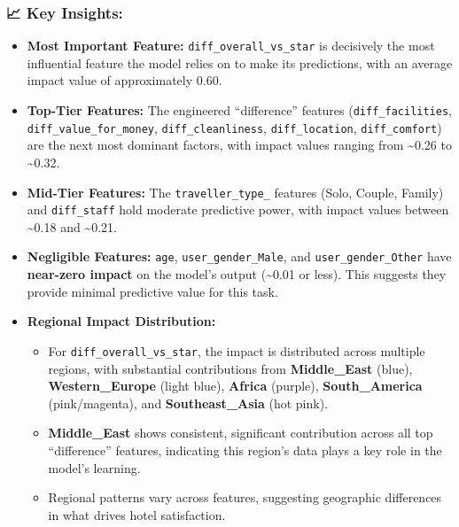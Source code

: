 \documentclass[
  letterpaper,
  DIV=11,
  numbers=noendperiod]{scrartcl}
\providecommand{\tightlist}{%
  \setlength{\itemsep}{0pt}\setlength{\parskip}{0pt}}
\begin{document}
\subsubsection{📈 Key Insights:}\label{key-insights}

\begin{itemize}
\tightlist
\item
  \textbf{Most Important Feature:} \texttt{diff\_overall\_vs\_star} is
  decisively the most influential feature the model relies on to make
  its predictions, with an average impact value of approximately 0.60.
\item
  \textbf{Top-Tier Features:} The engineered ``difference'' features
  (\texttt{diff\_facilities}, \texttt{diff\_value\_for\_money},
  \texttt{diff\_cleanliness}, \texttt{diff\_location},
  \texttt{diff\_comfort}) are the next most dominant factors, with
  impact values ranging from \textasciitilde0.26 to \textasciitilde0.32.
\item
  \textbf{Mid-Tier Features:} The \texttt{traveller\_type\_} features
  (Solo, Couple, Family) and \texttt{diff\_staff} hold moderate
  predictive power, with impact values between \textasciitilde0.18 and
  \textasciitilde0.21.
\item
  \textbf{Negligible Features:} \texttt{age},
  \texttt{user\_gender\_Male}, and \texttt{user\_gender\_Other} have
  \textbf{near-zero impact} on the model's output (\textasciitilde0.01
  or less). This suggests they provide minimal predictive value for this
  task.
\item
  \textbf{Regional Impact Distribution:}

  \begin{itemize}
  \tightlist
  \item
    For \texttt{diff\_overall\_vs\_star}, the impact is distributed
    across multiple regions, with substantial contributions from
    \textbf{Middle\_East} (blue), \textbf{Western\_Europe} (light blue),
    \textbf{Africa} (purple), \textbf{South\_America} (pink/magenta),
    and \textbf{Southeast\_Asia} (hot pink).
  \item
    \textbf{Middle\_East} shows consistent, significant contribution
    across all top ``difference'' features, indicating this region's
    data plays a key role in the model's learning.
  \item
    Regional patterns vary across features, suggesting geographic
    differences in what drives hotel satisfaction.
  \end{itemize}
\end{itemize}
\end{document}
